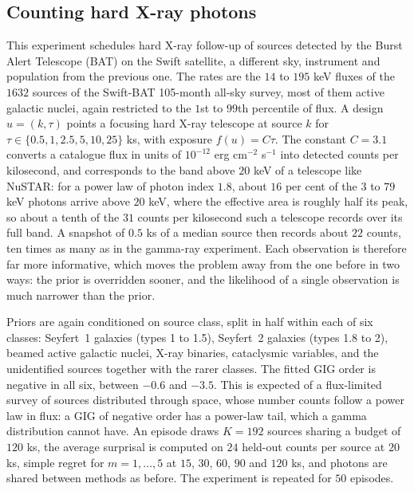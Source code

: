 \documentclass[twoside]{article}
\theoremstyle{plain}
\theoremstyle{definition}
\theoremstyle{remark}
\begin{document}
\subsection{Counting hard X-ray photons} \label{sec:exp_xray}
This experiment schedules hard X-ray follow-up of sources detected by the Burst Alert Telescope (BAT) on the Swift satellite, a different sky, instrument and population from the previous one.
The rates are the $14$ to $195$ keV fluxes of the $1632$ sources of the Swift-BAT 105-month all-sky survey, most of them active galactic nuclei, again restricted to the $1$st to $99$th percentile of flux.
A design $u = (k, \tau)$ points a focusing hard X-ray telescope at source $k$ for $\tau \in \{0.5, 1, 2.5, 5, 10, 25\}$ ks, with exposure $f(u) = C \tau$.
The constant $C = 3.1$ converts a catalogue flux in units of $10^{-12}$ erg cm$^{-2}$ s$^{-1}$ into detected counts per kilosecond, and corresponds to the band above $20$ keV of a telescope like NuSTAR: for a power law of photon index $1.8$, about $16$ per cent of the $3$ to $79$ keV photons arrive above $20$ keV, where the effective area is roughly half its peak, so about a tenth of the $31$ counts per kilosecond such a telescope records over its full band.
A snapshot of $0.5$ ks of a median source then records about $22$ counts, ten times as many as in the gamma-ray experiment.
Each observation is therefore far more informative, which moves the problem away from the one before in two ways: the prior is overridden sooner, and the likelihood of a single observation is much narrower than the prior.

Priors are again conditioned on source class, split in half within each of six classes: Seyfert~1 galaxies (types 1 to 1.5), Seyfert~2 galaxies (types 1.8 to 2), beamed active galactic nuclei, X-ray binaries, cataclysmic variables, and the unidentified sources together with the rarer classes.
The fitted GIG order is negative in all six, between $-0.6$ and $-3.5$.
This is expected of a flux-limited survey of sources distributed through space, whose number counts follow a power law in flux: a GIG of negative order has a power-law tail, which a gamma distribution cannot have.
An episode draws $K = 192$ sources sharing a budget of $120$ ks, the average surprisal is computed on $24$ held-out counts per source at $20$ ks, simple regret for $m = 1, \dots, 5$ at $15$, $30$, $60$, $90$ and $120$ ks, and photons are shared between methods as before.
The experiment is repeated for $50$ episodes.
\end{document}

